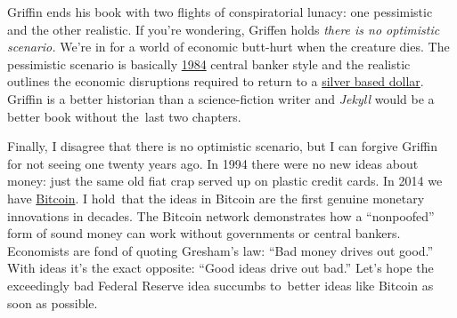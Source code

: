 Griffin ends his book with two flights of conspiratorial lunacy: one
pessimistic and the other realistic. If you're wondering, Griffen holds
\emph{there is no optimistic scenario.} We're in for a world of economic
butt-hurt when the creature dies. The pessimistic scenario is basically
\href{http://en.wikipedia.org/wiki/Nineteen\_Eighty-Four}{1984} central
banker style and the realistic outlines the economic disruptions
required to return to a \href{http://mises.org/daily/4149}{silver based
dollar}. Griffin is a better historian than a science-fiction writer and
\emph{Jekyll} would be a better book without the~last two chapters.

Finally, I disagree that there is no optimistic scenario, but I can
forgive Griffin for not seeing one twenty years ago. In 1994 there were
no new ideas about money: just the same old fiat crap served up on
plastic credit cards. In 2014 we have
\href{https://bitcoin.org/en/}{Bitcoin}. I hold~that the ideas in
Bitcoin are the first genuine monetary innovations in decades. The
Bitcoin network demonstrates how a ``nonpoofed'' form of sound money can
work without governments or central bankers. Economists are fond of
quoting Gresham's law: ``Bad money drives out good.'' With ideas it's
the exact opposite: ``Good ideas drive out bad.'' Let's hope the
exceedingly bad Federal Reserve idea succumbs to~better ideas like
Bitcoin as soon as possible.




%